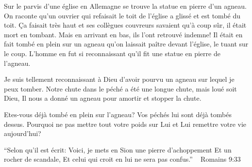 Sur le parvis d'une église en Allemagne se trouve la statue en pierre d'un agneau. On raconte qu'un ouvrier qui refaisait le toit de l'église a glissé et est tombé du toit. Ça faisait très haut et ses collègues couvreurs savaient qu'à coup sûr, il était mort en tombant. Mais en arrivant en bas, ils l'ont retrouvé indemne! Il était en fait tombé en plein sur un agneau qu'on laissait paître devant l'église, le tuant sur le coup. L'homme en fut si reconnaissant qu'il fit une statue en pierre de l'agneau.

Je suis tellement reconnaissant à Dieu d'avoir pourvu un agneau sur lequel je peux tomber. Notre chute dans le péché a été une longue chute, mais loué soit Dieu, Il nous a donné un agneau pour amortir et stopper la chute.

Etes-vous déjà tombé en plein sur l'agneau? Vos péchés lui sont déjà tombés dessus. Pourquoi ne pas mettre tout votre poids sur Lui et Lui remettre votre vie aujourd'hui?


“Selon qu’il est écrit: Voici, je mets en Sion une pierre d’achoppement Et un rocher de scandale, Et celui qui croit en lui ne sera pas confus.”  ~ Romains 9:33 

